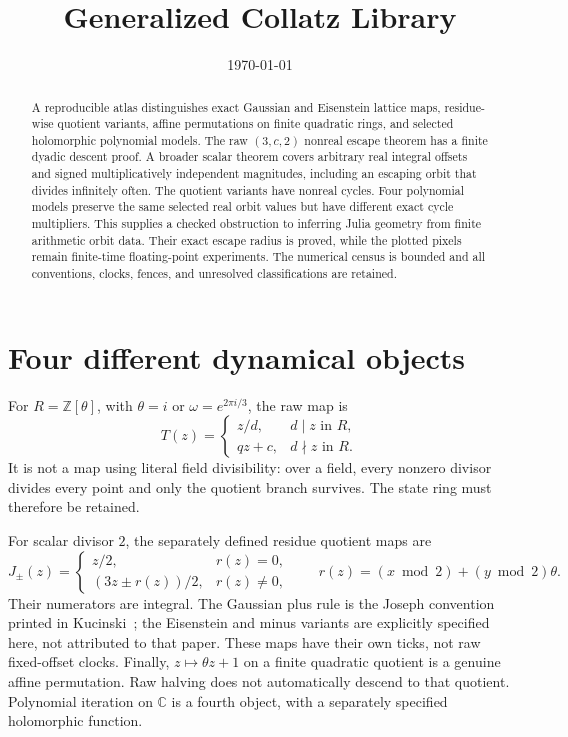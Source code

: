 \documentclass[11pt,letterpaper]{article}
\title{Generalized Collatz Library}
\author{}
\date{\today}
\newcommand{\Z}{\mathbb{Z}}
\newcommand{\C}{\mathbb{C}}
\begin{document}
\maketitle

\begin{abstract}
A reproducible atlas distinguishes exact Gaussian and Eisenstein lattice maps, residue-wise quotient variants, affine permutations on finite quadratic rings, and selected holomorphic polynomial models. The raw \((3,c,2)\) nonreal escape theorem has a finite dyadic descent proof. A broader scalar theorem covers arbitrary real integral offsets and signed multiplicatively independent magnitudes, including an escaping orbit that divides infinitely often. The quotient variants have nonreal cycles. Four polynomial models preserve the same selected real orbit values but have different exact cycle multipliers. This supplies a checked obstruction to inferring Julia geometry from finite arithmetic orbit data. Their exact escape radius is proved, while the plotted pixels remain finite-time floating-point experiments. The numerical census is bounded and all conventions, clocks, fences, and unresolved classifications are retained.
\end{abstract}

\section{Four different dynamical objects}

For \(R=\Z[\theta]\), with \(\theta=i\) or \(\omega=e^{2\pi i/3}\), the raw map is
\[
T(z)=\begin{cases}z/d,&d\mid z\text{ in }R,\\qz+c,&d\nmid z\text{ in }R.\end{cases}
\]
It is not a map using literal field divisibility: over a field, every nonzero divisor divides every point and only the quotient branch survives. The state ring must therefore be retained.

For scalar divisor \(2\), the separately defined residue quotient maps are
\[
J_\pm(z)=\begin{cases}z/2,&r(z)=0,\\(3z\pm r(z))/2,&r(z)\ne0,\end{cases}
\qquad r(z)=(x\bmod2)+(y\bmod2)\theta.
\]
Their numerators are integral. The Gaussian plus rule is the Joseph convention printed in Kucinski~\cite{Kucinski00}; the Eisenstein and minus variants are explicitly specified here, not attributed to that paper. These maps have their own ticks, not raw fixed-offset clocks. Finally, \(z\mapsto\theta z+1\) on a finite quadratic quotient is a genuine affine permutation. Raw halving does not automatically descend to that quotient. Polynomial iteration on \(\C\) is a fourth object, with a separately specified holomorphic function.
\end{document}
